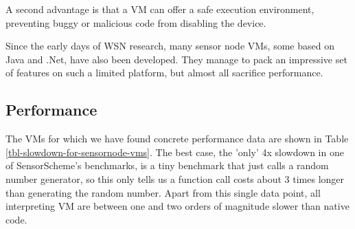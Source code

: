 A second advantage is that a VM can offer a safe execution environment, preventing buggy or malicious code from disabling the device.


Since the early days of WSN research, many sensor node VMs, some based on Java and .Net, have also been developed. They manage to pack an impressive set of features on such a limited platform, but almost all sacrifice performance.

\subsection{Performance}
The VMs for which we have found concrete performance data are shown in Table \ref{tbl-slowdown-for-sensornode-vms}. The best case, the 'only' 4x slowdown in one of SensorScheme's benchmarks, is a tiny benchmark that just calls a random number generator, so this only tells us a function call costs about 3 times longer than generating the random number. Apart from this single data point, all interpreting VM are between one and two orders of magnitude slower than native code.


